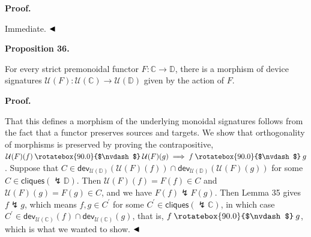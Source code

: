 \documentclass[10pt,a4paper]{article}
\begin{document}
 
 
 
\par\medskip\noindent\textbf{Proof.}\par
 
 
Immediate. $\hfill\blacktriangleleft$\par
 
 
 
\par\medskip\noindent\textbf{Proposition 36.}\par
 
 
For every strict premonoidal functor $F:\mathbb{C}\to\mathbb{D}$, there is a morphism of device signatures $\mathcal{U}(F):\mathcal{U}(\mathbb{C})\to\mathcal{U}(\mathbb{D})$ given by the action of $F$.\par
 
 
 
 
 
\par\medskip\noindent\textbf{Proof.}\par
 
 
That this defines a morphism of the underlying monoidal signatures follows from the fact that a functor preserves sources and targets. We show that orthogonality of morphisms is preserved by proving the contrapositive, $\mathcal{U}(F)(f)\mathbin{\rotatebox{90.0}{$\nvdash$}}\mathcal{U}(F)(g)\implies f\mathbin{\rotatebox{90.0}{$\nvdash$}}g$. Suppose that $C\in\mathsf{dev}_{\mathcal{U}(\mathbb{D})}(\mathcal{U}(F)(f))\cap\mathsf{dev}_{\mathcal{U}(\mathbb{D})}(\mathcal{U}(F)(g))$ for some $C\in\mathsf{cliques}({\lightning}\mathbb{D})$. Then $\mathcal{U}(F)(f)=F(f)\in C$ and $\mathcal{U}(F)(g)=F(g)\in C$, and we have $F(f)\lightning F(g)$. Then Lemma 35 gives $f\lightning g$, which means $f,g\in C^{\prime}$ for some $C^{\prime}\in\mathsf{cliques}({\lightning}\mathbb{C})$, in which case $C^{\prime}\in\mathsf{dev}_{\mathcal{U}(\mathbb{C})}(f)\cap\mathsf{dev}_{\mathcal{U}(\mathbb{C})}(g)$, that is, $f\mathbin{\rotatebox{90.0}{$\nvdash$}}g$, which is what we wanted to show. $\hfill\blacktriangleleft$\par
 
\end{document}
